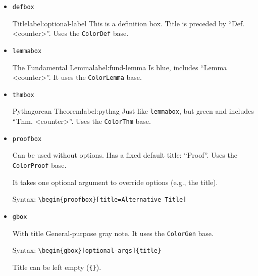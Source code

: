 \documentclass[a4paper,12pt]{report}
\begin{document}
\begin{itemize}
    \item \texttt{defbox}
        \begin{defbox}{Title}{label:optional-label}
            This is a definition box. Title is preceded by ``Def. <counter>''. Uses the \texttt{ColorDef} base.
        \end{defbox}

    \item \texttt{lemmabox}
        \begin{lemmabox}{The Fundamental Lemma}{label:fund-lemma}
            Is blue, includes ``Lemma <counter>''. It uses the \texttt{ColorLemma} base.
        \end{lemmabox}

    \item \texttt{thmbox}
        \begin{thmbox}{Pythagorean Theorem}{label:pythag}
            Just like \texttt{lemmabox}, but green and includes ``Thm. <counter>''. Uses the \texttt{ColorThm} base.
        \end{thmbox}

    \item \texttt{proofbox}
        \begin{proofbox}
            Can be used without options. Has a fixed default title: ``Proof''. Uses the \texttt{ColorProof} base.
        \end{proofbox}

        \begin{proofbox}[title=Alternative Title]
            It takes one optional argument to override options (e.g., the title).

            Syntax: \texttt{\textbackslash begin\{proofbox\}[title=Alternative Title]}
        \end{proofbox}

    \item \texttt{gbox}
        \begin{gbox}{With title}
            General-purpose gray note. It uses the \texttt{ColorGen} base.

            Syntax: \texttt{\textbackslash begin\{gbox\}[optional-args]\{title\}}
        \end{gbox}

        \begin{gbox}{}
            Title can be left empty (\texttt{\{\}}).
        \end{gbox}
\end{itemize}
\end{document}
